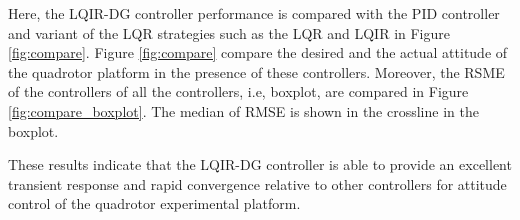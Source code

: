 \documentclass[3p,times]{elsarticle}
\begin{document}


\noindent Here, the LQIR-DG controller performance is compared with the PID controller and variant of the LQR strategies such as the LQR and LQIR in Figure \ref{fig:compare}. Figure \ref{fig:compare} compare the desired and the actual attitude of the quadrotor platform in the presence of these controllers.
Moreover, the RSME of the controllers of all the controllers, i.e, boxplot, are compared in Figure \ref{fig:compare_boxplot}. The median of RMSE is shown in the crossline in the boxplot.

These results indicate that the LQIR-DG controller is able to provide an excellent transient response and rapid convergence relative to other controllers for attitude control of the quadrotor experimental platform.
\end{document}
